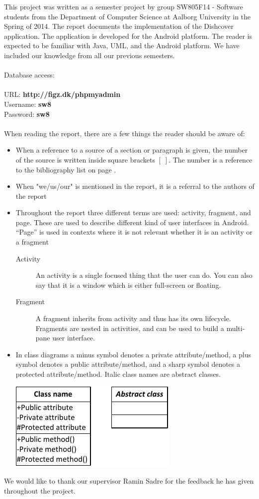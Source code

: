 This project was written as a semester project by group SW805F14 - Software students from the Department of Computer Science at Aalborg University in the Spring of 2014. The report documents the implementation of the Dishcover application. The application is developed for the Android platform. The reader is expected to be familiar with Java, UML, and the Android platform. We have included our knowledge from all our previous semesters.
\\\\
Database access:\\\\
URL: \textbf{http://figz.dk/phpmyadmin}\\
Username: \textbf{sw8}\\
Password: \textbf{sw8}\\\\
When reading the report, there are a few things the reader should be aware of:
\begin{itemize}
\item When a reference to a source of a section or paragraph is given, the number of the source is written inside square brackets $[\;]$. The number is a reference to the bibliography list on page \pageref{chap:bib}.
\item When "we/us/our" is mentioned in the report, it is a referral to the authors of the report
\item Throughout the report three different terms are used: activity, fragment, and page. These are used to describe different kind of user interfaces in Android. ``Page'' is used in contexts where it is not relevant whether it is an activity or a fragment
\begin{description}
\item[Activity] An activity is a single focused thing that the user can do. You can also say that it is a window which is either full-screen or floating. \citep{activity}
\item[Fragment] A fragment inherits from activity and thus has its own lifecycle. Fragments are nested in activities, and can be used to build a multi-pane user interface. \citep{fragment}
\end{description}
\item In class diagrams a minus symbol denotes a private attribute/method, a plus symbol denotes a public attribute/method, and a sharp symbol denotes a protected attribute/method. Italic class names are abstract classes.
\begin{center}
\includegraphics[width=0.35\linewidth]{img/umltheory.pdf}
\end{center}
\end{itemize}

We would like to thank our supervisor Ramin Sadre for the feedback he has given throughout the project.